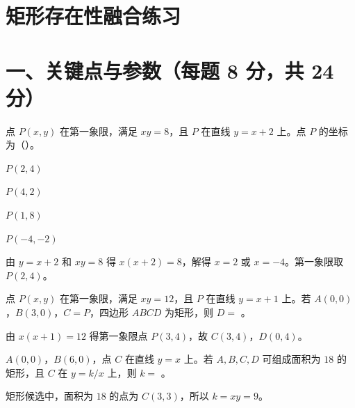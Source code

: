 \documentclass{exam-zh}
\begin{document}
\section*{矩形存在性融合练习}

\section*{一、关键点与参数（每题 8 分，共 24 分）}


\begin{question}[points=8]
  点 $P(x,y)$ 在第一象限，满足 $xy=8$，且 $P$ 在直线 $y=x+2$ 上。点 $P$ 的坐标为（\quad）。

  \begin{choices}
    \item $P(2,4)$
    \item $P(4,2)$
    \item $P(1,8)$
    \item $P(-4,-2)$
  \end{choices}
  \paren[A]
  \begin{solutionblock}
    由 $y=x+2$ 和 $xy=8$ 得 $x(x+2)=8$，解得 $x=2$ 或 $x=-4$。第一象限取 $P(2,4)$。
  \end{solutionblock}
\end{question}



\begin{question}[points=8]
  点 $P(x,y)$ 在第一象限，满足 $xy=12$，且 $P$ 在直线 $y=x+1$ 上。若 $A(0,0)$，$B(3,0)$，$C=P$，四边形 $ABCD$ 为矩形，则 $D=$ \underline{\hspace{2cm}}。

  \paren[$(0,4)$]
  \begin{solutionblock}
    由 $x(x+1)=12$ 得第一象限点 $P(3,4)$，故 $C(3,4)$，$D(0,4)$。
  \end{solutionblock}
\end{question}



\begin{question}[points=8]
  $A(0,0)$，$B(6,0)$，点 $C$ 在直线 $y=x$ 上。若 $A,B,C,D$ 可组成面积为 $18$ 的矩形，且 $C$ 在 $y=k/x$ 上，则 $k=$ \underline{\hspace{2cm}}。

  \paren[$9$]
  \begin{solutionblock}
    矩形候选中，面积为 $18$ 的点为 $C(3,3)$，所以 $k=xy=9$。
  \end{solutionblock}
\end{question}
\end{document}
